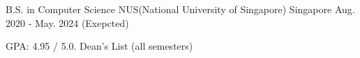 

\begin{cventries}

  \cventry
    {B.S. in Computer Science} %
    {NUS(National University of Singapore)} %
    {Singapore} %
    {Aug. 2020 - May. 2024 (Exepcted)} %
    {
      \begin{cvitems} %
      \item {GPA: 4.95 / 5.0. Dean's List (all semesters)}
      \end{cvitems}
    }


\end{cventries}
